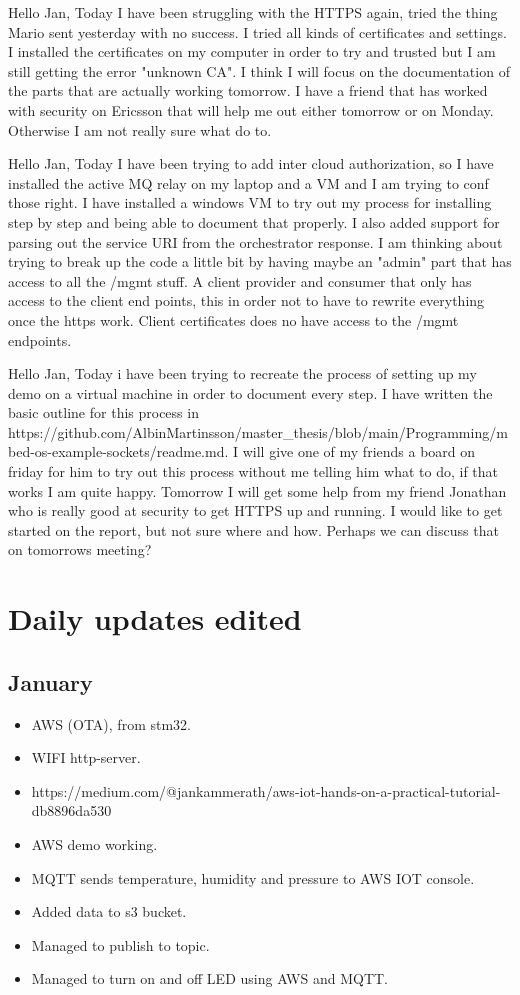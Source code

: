 Hello Jan,
Today I have been struggling with the HTTPS again, tried the thing Mario sent yesterday with no success. I tried all kinds of certificates and settings. I installed the
certificates on my computer in order to try and trusted but I am still getting the error "unknown CA". I think I will focus on the documentation of the parts that are
actually working tomorrow. I have a friend that has worked with security on Ericsson that will help me out either tomorrow or on Monday. Otherwise I am not really sure
what do to.

Hello Jan,
Today I have been trying to add inter cloud authorization, so I have installed the active MQ relay on my laptop and a VM and I am trying to conf those right.
I have installed a windows VM to try out my process for installing step by step and being able to document that properly. I also added support for parsing out
the service URI from the orchestrator response. I am thinking about trying to break up the code a little bit by having maybe an "admin" part that has access
to all the /mgmt stuff. A client provider and consumer that only has access to the client end points, this in order not to have to rewrite everything once the
https work. Client certificates does no have access to the /mgmt endpoints.

Hello Jan,
Today i have been trying to recreate the process of setting up my demo on a virtual machine in order to document every step. I have written the basic outline
for this process in https://github.com/AlbinMartinsson/master_thesis/blob/main/Programming/mbed-os-example-sockets/readme.md. I will give one of my friends
a board on friday for him to try out this process without me telling him what to do, if that works I am quite happy. Tomorrow I will get some help from my
friend Jonathan who is really good at security to get HTTPS up and running. I would like to get started on the report, but not sure where and how. Perhaps
we can discuss that on tomorrows meeting?

\section{Daily updates edited}

\subsection{January}

\begin{itemize}
    \item AWS (OTA), from stm32.
    \item WIFI http-server.
    \item https://medium.com/@jankammerath/aws-iot-hands-on-a-practical-tutorial-db8896da530
    \item AWS demo working.
    \item MQTT sends temperature, humidity and pressure to AWS IOT console.
    \item Added data to s3 bucket.
    \item Managed to publish to topic.
    \item Managed to turn on and off LED using AWS and MQTT.
\end{itemize}

